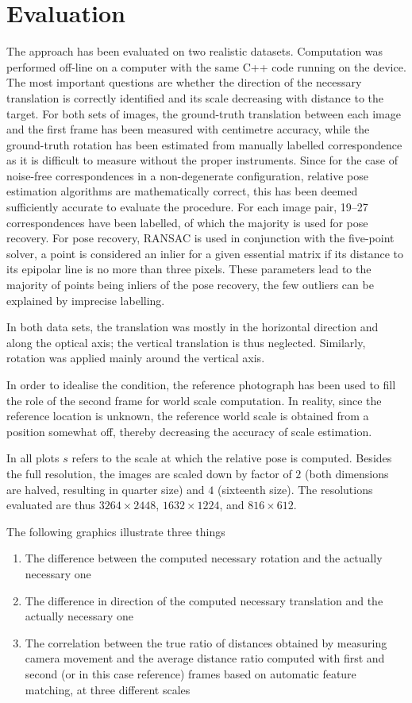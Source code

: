 \chapter{Evaluation}
\label{ch:evaluation}

The approach has been evaluated on two realistic datasets. Computation was
performed off-line on a computer with the same C++ code running on the device.
The most important questions are whether the direction of the necessary
translation is correctly identified and its scale decreasing with distance to
the target.  For both sets of images, the ground-truth translation between each
image and the first frame has been measured with centimetre accuracy, while the
ground-truth rotation has been estimated from manually labelled correspondence
as it is difficult to measure without the proper instruments. Since for the case
of noise-free correspondences in a non-degenerate configuration, relative pose
estimation algorithms are mathematically correct, this has been deemed
sufficiently accurate to evaluate the procedure. For each image pair, 19--27
correspondences have been labelled, of which the majority is used for pose
recovery. For pose recovery, RANSAC is used in conjunction with the five-point
solver, a point is considered an inlier for a given essential matrix if its
distance to its epipolar line is no more than three pixels. These parameters
lead to the majority of points being inliers of the pose recovery, the few
outliers can be explained by imprecise labelling.

In both data sets, the translation was mostly in the horizontal direction and
along the optical axis; the vertical translation is thus neglected. Similarly,
rotation was applied mainly around the vertical axis.

In order to idealise the condition, the reference photograph has been used to
fill the role of the second frame for world scale computation. In reality, since
the reference location is unknown, the reference world scale is obtained from a
position somewhat off, thereby decreasing the accuracy of scale estimation.

In all plots $s$ refers to the scale at which the relative pose is computed.
Besides the full resolution, the images are scaled down by factor of $2$ (both
dimensions are halved, resulting in quarter size) and $4$ (sixteenth size). The
resolutions evaluated are thus $3264\times2448$, $1632\times1224$, and
$816\times612$.

The following graphics illustrate three things
\begin{enumerate}
   \item The difference between the computed necessary rotation and the actually
      necessary one
   \item The difference in direction of the computed necessary translation and
      the actually necessary one
   \item The correlation between the true ratio of distances obtained by
      measuring camera movement and the average distance ratio computed with first
      and second (or in this case reference) frames based on automatic feature matching, at
      three different scales
\end{enumerate}

